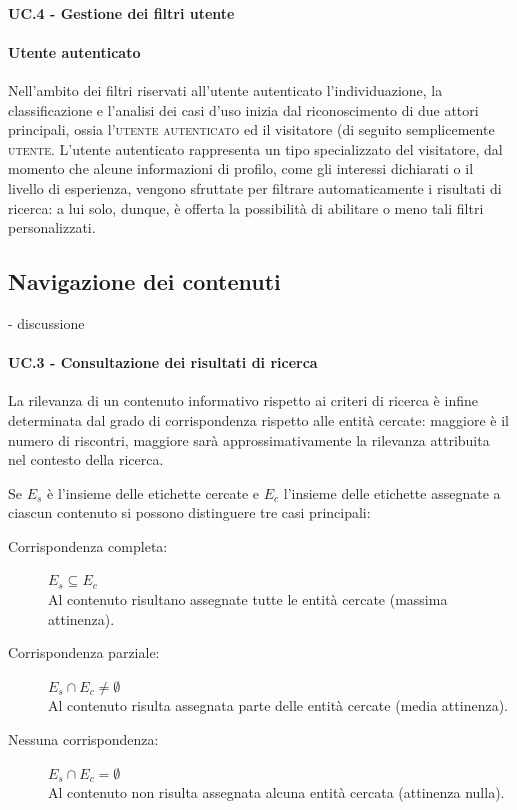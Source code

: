 \paragraph{UC.4 - Gestione dei filtri utente}

\paragraph{Utente autenticato}
Nell'ambito dei filtri riservati all'utente autenticato l'individuazione, la classificazione e l'analisi dei casi d'uso inizia dal riconoscimento di due attori principali, ossia l'\textsc{utente autenticato} ed il visitatore (di seguito semplicemente \textsc{utente}. L'utente autenticato rappresenta un tipo specializzato del visitatore, dal momento che alcune informazioni di profilo, come gli interessi dichiarati o il livello di esperienza, vengono sfruttate per filtrare automaticamente i risultati di ricerca: a lui solo, dunque, è offerta la possibilità di abilitare o meno tali filtri personalizzati.

\subsection{Navigazione dei contenuti}
- discussione

\paragraph{UC.3 - Consultazione dei risultati di ricerca}

La rilevanza di un contenuto informativo rispetto ai criteri di ricerca è infine determinata dal grado di corrispondenza rispetto alle entità cercate: maggiore è il numero di riscontri, maggiore sarà approssimativamente la rilevanza attribuita nel contesto della ricerca.

Se $E_s$ è l'insieme delle etichette cercate e $E_c$ l'insieme delle etichette assegnate a ciascun contenuto si possono distinguere tre casi principali:
\begin{description}
\item[Corrispondenza completa:] $E_s \subseteq E_c$ \hfill \\
Al contenuto risultano assegnate tutte le entità cercate (massima attinenza).
\item[Corrispondenza parziale:] $E_s \cap E_c \neq \emptyset$ \hfill \\
Al contenuto risulta assegnata parte delle entità cercate (media attinenza).
\item[Nessuna corrispondenza:] $E_s \cap E_c = \emptyset$\hfill \\
Al contenuto non risulta assegnata alcuna entità cercata (attinenza nulla).
\end{description}

